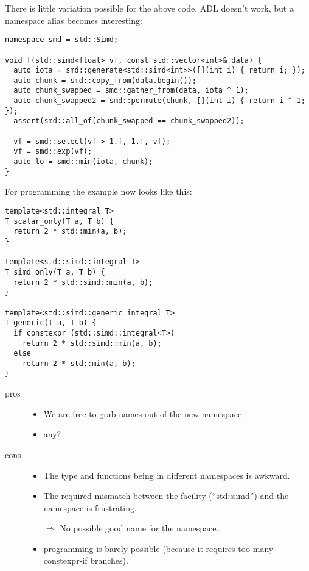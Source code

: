 There is little variation possible for the above code.
ADL doesn't work, but a namespace alias becomes interesting:
\medskip\begin{lstlisting}[style=Vc]
namespace smd = std::Simd;

void f(std::simd<float> vf, const std::vector<int>& data) {
  auto iota = smd::generate<std::simd<int>>([](int i) { return i; });
  auto chunk = smd::copy_from(data.begin());
  auto chunk_swapped = smd::gather_from(data, iota ^ 1);
  auto chunk_swapped2 = smd::permute(chunk, [](int i) { return i ^ 1; });
  assert(smd::all_of(chunk_swapped == chunk_swapped2));

  vf = smd::select(vf > 1.f, 1.f, vf);
  vf = smd::exp(vf);
  auto lo = smd::min(iota, chunk);
}
\end{lstlisting}

For \simdgeneric programming the example now looks like this:
\medskip\begin{lstlisting}[style=Vc]
template<std::integral T>
T scalar_only(T a, T b) {
  return 2 * std::min(a, b);
}

template<std::simd::integral T>
T simd_only(T a, T b) {
  return 2 * std::simd::min(a, b);
}

template<std::simd::generic_integral T>
T generic(T a, T b) {
  if constexpr (std::simd::integral<T>)
    return 2 * std::simd::min(a, b);
  else
    return 2 * std::min(a, b);
}
\end{lstlisting}

\begin{description}
  \item[pros]
    \begin{itemize}
      \item We are free to grab names out of the new namespace.
      \item any?
    \end{itemize}

  \item[cons]
    \begin{itemize}
      \item The type and functions being in different namespaces is awkward.
      \item The required mismatch between the facility (“std::simd”) and the
        namespace is frustrating.
      \item[$\Rightarrow$] No possible good name for the namespace.

      \item \simdgeneric programming is barely possible (because it requires
        too many constexpr-if branches).
    \end{itemize}
\end{description}

